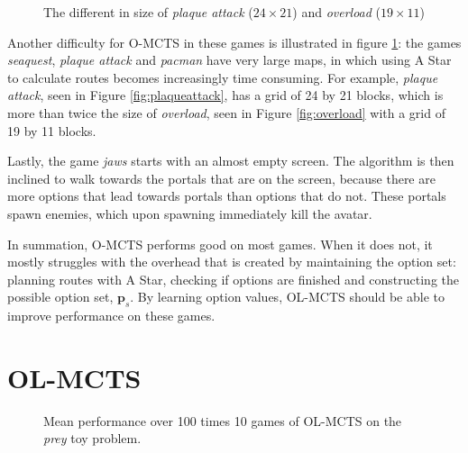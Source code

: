 \begin{figure}
	\centering
	\caption{The different in size of \textit{plaque attack} ($24\times21$) and 
		\textit{overload} ($19\times11$)}
	\label{fig:game-size}
\end{figure}

Another difficulty for O-MCTS in these games is illustrated in figure
\ref{fig:game-size}: the games \textit{seaquest}, \textit{plaque attack} and
\textit{pacman} have very large maps, in which using A Star to calculate routes
becomes increasingly time consuming. For example, \textit{plaque attack}, seen
in Figure \ref{fig:plaqueattack}, has a grid of 24 by 21 blocks, which is more
than twice the size of \textit{overload}, seen in Figure \ref{fig:overload} with
a grid of 19 by 11 blocks.

Lastly, the game \textit{jaws} starts with an almost empty screen. The algorithm
is then inclined to walk towards the portals that are on the screen, because
there are more options that lead towards portals than options that do not. These
portals spawn enemies, which upon spawning immediately kill the avatar. 

In summation, O-MCTS performs good on most games. When it does not, it mostly
struggles with the overhead that is created by maintaining the option set:
planning routes with A Star, checking if options are finished and constructing
the possible option set, $\mathbf{p}_s$. By learning option values, OL-MCTS
should be able to improve performance on these games.

\section{OL-MCTS}
\label{subsec:olmcts}

\begin{figure}
	\centering
	\caption{Mean performance over 100 times 10 games of OL-MCTS on the
	\textit{prey} toy problem.}
	\label{fig:olmctsPrey}
\end{figure}

